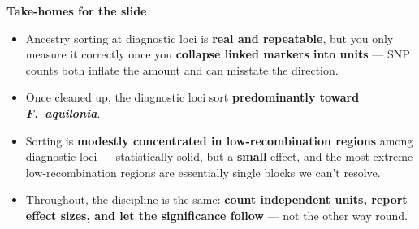 \documentclass[11pt]{article}
\newcommand{\Faq}{\textit{F.~aquilonia}}
\newcommand{\pt}[1]{\medskip\noindent\textbf{\color{Accent}#1}\par\nobreak\smallskip}
\begin{document}
\pt{Take-homes for the slide}
\begin{itemize}
  \item Ancestry sorting at diagnostic loci is \textbf{real and repeatable}, but you only
        measure it correctly once you \textbf{collapse linked markers into units} --- SNP
        counts both inflate the amount and can misstate the direction.
  \item Once cleaned up, the diagnostic loci sort \textbf{predominantly toward \Faq{}}.
  \item Sorting is \textbf{modestly concentrated in low-recombination regions} among diagnostic
        loci --- statistically solid, but a \textbf{small} effect, and the most extreme
        low-recombination regions are essentially single blocks we can't resolve.
  \item Throughout, the discipline is the same: \textbf{count independent units, report effect
        sizes, and let the significance follow} --- not the other way round.
\end{itemize}
\end{document}
